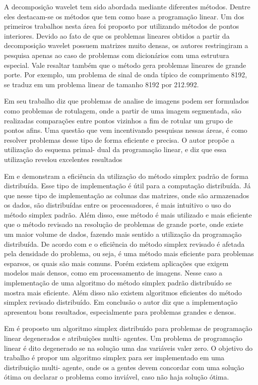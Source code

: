 A decomposição wavelet tem sido abordada mediante diferentes métodos. Dentre eles destacam-se os métodos que tem como base a programação linear. Um dos primeiros trabalhos nesta área foi proposto por  utilizando métodos de pontos interiores. Devido ao fato de que os problemas lineares obtidos a partir da decomposição wavelet possuem matrizes muito densas, os autores restringiram a pesquisa apenas ao caso de problemas com dicionários com uma estrutura especial.  Vale resaltar também que o método gera problemas lineares de grande porte. Por exemplo, um problema de sinal de onda típico de comprimento 8192, se traduz em um problema linear de tamanho 8192 por 212.992.

Em seu trabalho  diz que problemas de analise de imagens podem ser formulados como problemas de rotulagem, onde a partir de uma imagem segmentada, são realizadas comparações entre pontos vizinhos a fim de rotular um grupo de pontos afins. Uma questão que vem incentivando pesquisas nessas áreas, é como resolver problemas desse tipo de forma eficiente e precisa. O autor propõe a utilização do esquema primal- dual da programação linear, e diz que essa utilização revelou excelentes resultados

Em  e  demonstram a eficiência da utilização do método simplex padrão de forma distribuída. Esse tipo de implementação é útil para a computação distribuída. Já que nesse tipo de implementação as colunas das matrizes, onde são armazenados os dados, são distribuídas entre os processadores, é mais intuitivo o uso do método simplex padrão. Além disso, esse método é mais utilizado e mais eficiente que o método revisado na resolução de problemas de grande porte, onde existe um maior volume de dados, fazendo mais sentido a utilização da programação distribuída.
De acordo com  e  o eficiência do método simplex revisado é afetada pela densidade do problema, ou seja, é uma método mais eficiente para problemas esparsos, os quais são mais comuns. Porém existem aplicações que exigem modelos mais densos, como em processamento de imagens. Nesse caso a implementação de uma algoritmo do método simplex padrão distribuído se mostra mais eficiente. Além disso não existem algoritmos eficientes do método simplex revisado distribuído. Em conclusão o autor diz que a implementação apresentou bons resultados, especialmente para problemas grandes e densos.

Em  é proposto um algoritmo simplex distribuído para problemas de programação linear degenerados e atribuições multi- agentes. Um problema de programação linear é dito degenerado se na solução uma das variáveis valer zero. O objetivo do trabalho é propor um algoritmo simplex para ser implementado em uma distribuição multi- agente, onde os a gentes devem concordar com uma solução ótima ou declarar o problema como inviável, caso não haja solução ótima.

